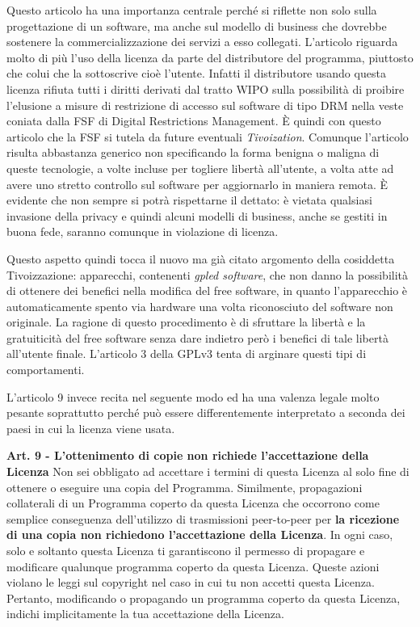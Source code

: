 Questo articolo ha una importanza centrale perché si riflette non solo sulla progettazione di un software, ma anche sul modello di business che dovrebbe sostenere la commercializzazione dei servizi a esso collegati. L'articolo riguarda molto di più l'uso della licenza da parte del distributore del programma, piuttosto che colui che la sottoscrive cioè l'utente. Infatti il distributore usando questa licenza rifiuta tutti i diritti derivati dal tratto WIPO sulla possibilità di proibire l'elusione a misure di restrizione di accesso sul software di tipo DRM nella veste coniata dalla FSF di Digital Restrictions Management. \`E quindi con questo articolo che la FSF si tutela da future eventuali \textit{Tivoization}. Comunque l'articolo risulta abbastanza generico non specificando la forma benigna o maligna di queste tecnologie, a volte incluse per togliere libertà all'utente, a volta atte ad avere uno stretto controllo sul software per aggiornarlo in maniera remota. \`E evidente che non sempre si potrà rispettarne il dettato: è vietata qualsiasi invasione della privacy e quindi alcuni modelli di business, anche se gestiti in buona fede, saranno comunque in violazione di licenza.

Questo aspetto quindi tocca il nuovo ma già citato argomento della cosiddetta Tivoizzazione: apparecchi, contenenti \textit{gpled software}, che non danno la possibilità di ottenere dei benefici nella modifica del free software, in quanto l'apparecchio è automaticamente spento via hardware una volta riconosciuto del software non originale. La ragione di questo procedimento è di sfruttare la libertà e la gratuiticità del free software senza dare indietro però i benefici di tale libertà all'utente finale. L'articolo 3 della GPLv3 tenta di arginare questi tipi di comportamenti.

L'articolo 9 invece recita nel seguente modo ed ha una valenza legale molto pesante soprattutto perché può essere differentemente interpretato a seconda dei paesi in cui la licenza viene usata.\\


\begin{scriptsize}\textbf{Art. 9 - L'ottenimento di copie non richiede l'accettazione della Licenza}
Non sei obbligato ad accettare i termini di questa Licenza al solo fine di ottenere o eseguire una copia del Programma. Similmente, propagazioni collaterali di un Programma coperto da questa Licenza che occorrono come semplice conseguenza dell'utilizzo di trasmissioni peer-to-peer per \textbf{la ricezione di una copia non richiedono l'accettazione della Licenza}. In ogni caso, solo e soltanto questa Licenza ti garantiscono il permesso di propagare e modificare qualunque programma coperto da questa Licenza. Queste azioni violano le leggi sul copyright nel caso in cui tu non accetti questa Licenza. Pertanto, modificando o propagando un programma coperto da questa Licenza, indichi implicitamente la tua accettazione della Licenza.\\

\end{scriptsize}

